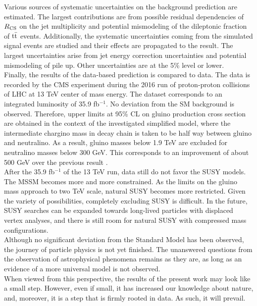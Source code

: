 Various sources of systematic uncertainties on the background prediction are estimated. The largest contributions are from possible residual dependencies of $R_{\rm CS}$ on the jet multiplicity and potential mismodeling of the dileptonic fraction of $\rm t\bar{t}$ events. Additionally, the systematic uncertainties coming from the simulated signal events are studied and their effects are propagated to the result. The largest uncertainties arise from jet energy correction uncertainties and potential mismodeling of pile up. Other uncertainties are at the 5\% level or lower.\\
Finally, the results of the data-based prediction is compared to data. The data is recorded by the CMS experiment during the 2016 run of proton-proton collisions of LHC at 13 TeV center of mass energy. The dataset corresponds to an integrated luminosity of 35.9 fb$^{-1}$. No deviation from the SM background is observed. Therefore, upper limits at 95\% CL on gluino production cross section are obtained in the context of the investigated simplified model, where the intermediate chargino mass in decay chain is taken to be half way between gluino and neutralino. As a result, gluino masses below 1.9 TeV are excluded for neutralino masses below 300 GeV. This corresponds to an improvement of about 500 GeV over the previous result \cite{SUS_16_005}.\\
After the 35.9 fb$^{-1}$ of the 13 TeV run, data still do not favor the SUSY models. The MSSM becomes more and more constrained. As the limits on the gluino mass approach to two TeV scale, natural SUSY becomes more restricted. Given the variety of possibilities, completely excluding SUSY is difficult. In the future, SUSY searches can be expanded towards long-lived particles with displaced vertex analyses, and there is still room for natural SUSY with compressed mass configurations. \\
Although no significant deviation from the Standard Model has been observed, the journey of particle physics is not yet finished. The unanswered questions from the observation of astrophysical phenomena remains as they are, as long as an evidence of a more universal model is not observed. \\
When viewed from this perspective, the results of the present work may look like a small step. However, even if small, it has increased our knowledge about nature, and, moreover, it is a step that is firmly rooted in data. As such, it will prevail.
